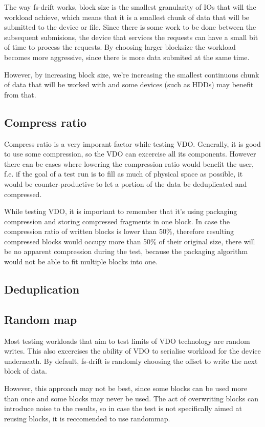 \documentclass[
  color, %
  table, %
  lof,   %
  lot,   %
]{fithesis3}
\begin{document}
The way fs-drift works, block size is the smallest granularity of IOs that will the workload achieve, which means that it is a smallest chunk of data that will be submitted to the device or file. Since there is some work to be done between the subsequent submisions, the device that services the requests can have a small bit of time to process the requests. By choosing larger blocksize the workload becomes more aggressive, since there is more data submited at the same time. 

However, by increasing block size, we're increasing the smallest continuous chunk of data that will be worked with and some devices (such as HDDs) may benefit from that.

\subsection{Compress ratio}
Compress ratio is a very imporant factor while testing VDO. Generally, it is good to use some compression, so the VDO can excercise all its components. However there can be cases where lowering the compression ratio would benefit the user, f.e. if the goal of a test run is to fill as much of physical space as possible, it would be counter-productive to let a portion of the data be deduplicated and compressed.

While testing VDO, it is important to remember that it's using packaging compression and storing compressed fragments in one block. In case the compression ratio of written blocks is lower than 50\%, therefore resulting compressed blocks would occupy more than 50\% of their original size, there will be no apparent compression during the test, because the packaging algorithm would not be able to fit multiple blocks into one.

\subsection{Deduplication}


\subsection{Random map}
Most testing workloads that aim to test limits of VDO technology are random writes. This also excercises the ability of VDO to serialise workload for the device underneath. By default, fs-drift is randomly choosing the offset to write the next block of data.

However, this approach may not be best, since some blocks can be used more than once and some blocks may never be used. The act of overwriting blocks can introduce noise to the results, so in case the test is not specifically aimed at reusing blocks, it is reccomended to use randommap.
\end{document}
